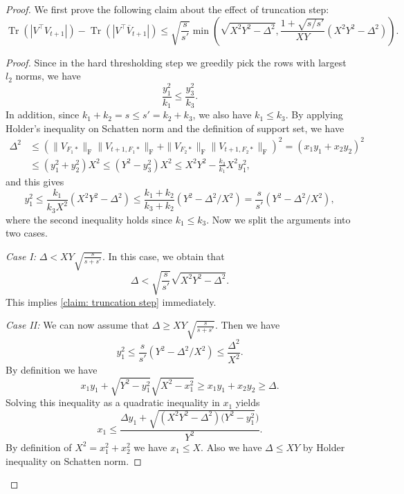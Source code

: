 \documentclass[11pt]{article}
\newcommand{\nb}[1]{\textcolor{orange}{\texttt{[#1]}}}
\newcommand{\hs}{s'}
\newcommand{\scale}{V}
\newcommand{\gd}{\overline{V}}
\DeclareMathOperator{\Tr}{Tr}
\newcommand{\0}{{\mathbf{0}}}
\begin{document}
\begin{proof}
We first prove the following claim about the effect of truncation step:
\begin{equation}\label{claim: truncation step}
\Tr(|{\scale}^\top  V_{t+1}|)-  \Tr(|{\scale}^\top  \gd_{t+1}|)\leq\sqrt{\frac{s}{\hs}}
\min\left( \sqrt{X^2Y^2-\Delta^2},
\frac{1+\sqrt{{s}/{\hs}}}{XY}(X^2Y^2-\Delta^2) \right).
\end{equation}
\begin{proof}
Since in the hard thresholding step we greedily pick the rows with largest $l_2$ norms, we have
\begin{equation*}
\frac{y_1^2}{k_1}\leq \frac{y_3^2}{k_3}.
\end{equation*}
In addition, since $k_1 + k_2 = s\leq s' = k_2 + k_3$, we also have $k_1\leq k_3$. 
By applying Holder's inequality on Schatten norm and the definition of support set, we have
\begin{align*}
\Delta^2 &\leq (\|\scale_{F_1*}\|_\mathrm{F}\|V_{t+1,F_1*}\|_\mathrm{F}+\|\scale_{F_2*}\|_\mathrm{F}\|V_{t+1,F_2*}\|_\mathrm{F})^2
= (x_1y_1+x_2y_2)^2\\&\leq(y_1^2+y_2^2)X^2\leq(Y^2-y_3^2)X^2\leq X^2Y^2-\frac{k_3}{k_1}X^2y_1^2,
\end{align*}
and this gives \begin{equation*}
    y_1^2\leq \frac{k_1}{k_3X^2}(X^2Y^2-\Delta^2)\leq
      \frac{k_1 + k_2}{k_3 + k_2}(Y^2-\Delta^2/X^2)
      = \frac{s}{\hs}(Y^2-\Delta^2/X^2),
\end{equation*}
where the second inequality holds since $k_1 \leq k_3$. 
Now we split the arguments into two cases.

\par \textit{Case I:} $\Delta< XY\sqrt{\frac{s}{s+\hs}}$.  
In this case, we obtain that \begin{equation*}
\Delta<\sqrt{\frac{s}{\hs}}\sqrt{X^2Y^2-\Delta^2}.
\end{equation*}
This implies \eqref{claim: truncation step} immediately.
 
\par \textit{Case II:} 
We can now assume that $\Delta\geq XY\sqrt{\frac{s}{s+\hs}}$. Then we have\begin{equation*}
    y_1^2\leq  \frac{s}{\hs}(Y^2-\Delta^2/X^2)\leq\frac{\Delta^2}{X^2}.
\end{equation*}
By definition we have
\begin{equation*}
    x_1y_1+\sqrt{Y^2-y_1^2}\sqrt{X^2-x_1^2}\geq x_1y_1+x_2y_2\geq \Delta.
\end{equation*}
Solving this inequality as a quadratic inequality in $x_1$ yields
\begin{equation*}
    x_1\leq \frac{\Delta y_1+\sqrt{(X^2Y^2-\Delta^2)(Y^2-y_1^2})}{Y^2}.
\end{equation*}
By definition of $X^2=x_1^2+x_2^2$ we have  $x_1\leq X$. Also we have $\Delta\leq XY$ by Holder inequality on Schatten norm.


\end{proof}
\end{proof}
\end{document}

